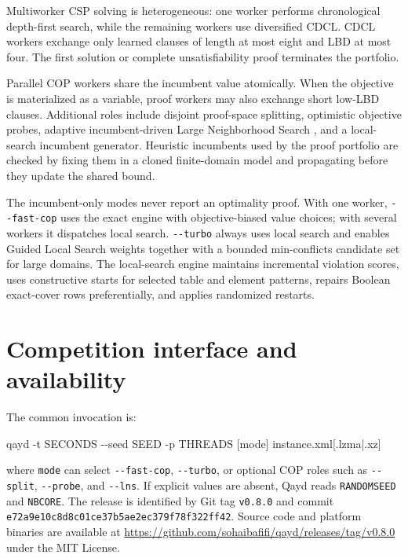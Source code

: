 \documentclass[10pt,letterpaper]{article}
\begin{document}
Multiworker CSP solving is heterogeneous: one worker performs chronological
depth-first search, while the remaining workers use diversified CDCL. CDCL
workers exchange only learned clauses of length at most eight and LBD at most
four. The first solution or complete unsatisfiability proof terminates the
portfolio.

Parallel COP workers share the incumbent value atomically. When the objective
is materialized as a variable, proof workers may also exchange short low-LBD
clauses. Additional roles include disjoint proof-space splitting, optimistic
objective probes, adaptive incumbent-driven Large Neighborhood Search
\cite{lns}, and a local-search incumbent generator. Heuristic incumbents used by
the proof portfolio are checked by fixing them in a cloned finite-domain model
and propagating before they update the shared bound.

The incumbent-only modes never report an optimality proof. With one worker,
\texttt{-{}-fast-cop} uses the exact engine with objective-biased value choices;
with several workers it dispatches local search. \texttt{-{}-turbo} always uses
local search and enables Guided Local Search weights together with a bounded
min-conflicts candidate set for large domains. The local-search engine maintains
incremental violation scores, uses constructive starts for selected table and
element patterns, repairs Boolean exact-cover rows preferentially, and applies
randomized restarts.

\section{Competition interface and availability}

The common invocation is:
\begin{center}
\small\ttfamily
qayd -t SECONDS -{}-seed SEED -p THREADS [mode] instance.xml[.lzma|.xz]
\end{center}
where \texttt{mode} can select \texttt{-{}-fast-cop}, \texttt{-{}-turbo}, or
optional COP roles such as \texttt{-{}-split}, \texttt{-{}-probe}, and
\texttt{-{}-lns}. If explicit values are absent, Qayd reads \texttt{RANDOMSEED}
and \texttt{NBCORE}. The release is identified by Git tag \texttt{v0.8.0} and
commit \texttt{e72a9e10c8d8c01ce37b5ae2ec379f78f322ff42}. Source code and platform
binaries are available at \url{https://github.com/sohaibafifi/qayd/releases/tag/v0.8.0}
under the MIT License.
\end{document}

